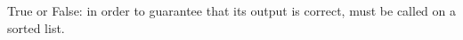 \begin{prob}
    True or False: in order to guarantee that its output is correct,
     must be called on a sorted list.

    \tF{}
\end{prob}
